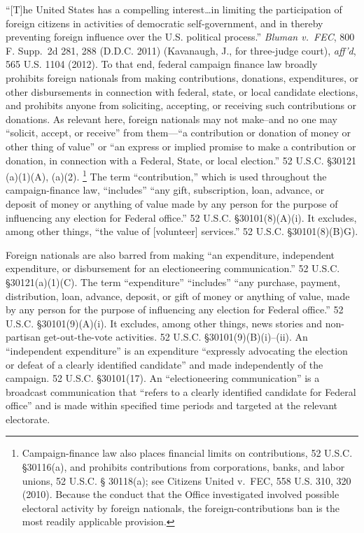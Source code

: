 ``[T]he United States has a compelling interest\dots in limiting the participation of foreign citizens in activities of democratic self-government, and in thereby preventing foreign influence over the U.S. political process.''
\textit{Bluman v.\ FEC}, 800 F. Supp.~2d 281, 288 (D.D.C. 2011) (Kavanaugh, J., for three-judge court), \textit{aff'd}, 565 U.S. 1104 (2012).
To that end, federal campaign finance law broadly prohibits foreign nationals from making contributions, donations, expenditures, or other disbursements in connection with federal, state, or local candidate elections, and prohibits anyone from soliciting, accepting, or receiving such contributions or donations.
As relevant here, foreign nationals may not make--and no one may ``solicit, accept, or receive'' from them---``a contribution or donation of money or other thing of value'' or ``an express or implied promise to make a contribution or donation, in connection with a Federal, State, or local election.''
52 U.S.C. \S 30121 (a)(1)(A), (a)(2).%
\footnote{Campaign-finance law also places financial limits on contributions, 52 U.S.C. \S 30116(a), and prohibits contributions from corporations, banks, and labor unions, 52 U.S.C. § 30118(a);
see Citizens United v.\ FEC, 558 U.S. 310, 320 (2010).
Because the conduct that the Office investigated involved possible electoral activity by foreign nationals, the foreign-contributions ban is the most readily applicable provision.}
The term ``contribution,'' which is used throughout the campaign-finance law, ``includes'' ``any gift, subscription, loan, advance, or deposit of money or anything of value made by any person for the purpose of influencing any election for Federal office.''
52 U.S.C. \S 30101(8)(A)(i).
It excludes, among other things, ``the value of [volunteer] services.'' 52 U.S.C. \S 30101(8)(B)G).

Foreign nationals are also barred from making ``an expenditure, independent expenditure, or disbursement for an electioneering communication.''
52 U.S.C. \S 30121(a)(1)(C).
The term ``expenditure'' ``includes'' ``any purchase, payment, distribution, loan, advance, deposit, or gift of money or anything of value, made by any person for the purpose of influencing any election for Federal office.''
52 U.S.C. \S 30101(9)(A)(i).
It excludes, among other things, news stories and non-partisan get-out-the-vote activities.
52 U.S.C. \S 30101(9)(B)(i)--(ii).
An ``independent expenditure'' is an expenditure ``expressly advocating the election or defeat of a clearly identified candidate'' and made independently of the campaign.
52 U.S.C. \S 30101(17).
An ``electioneering communication'' is a broadcast communication that ``refers to a clearly identified candidate for Federal office'' and is made within specified time periods and targeted at the relevant electorate.

